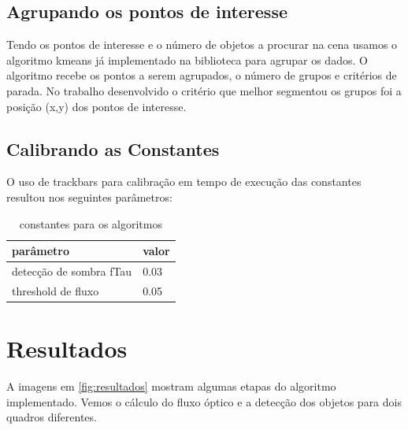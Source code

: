\documentclass[journal]{IEEEtran}
\begin{document}
\subsection{Agrupando os pontos de interesse}
Tendo os pontos de interesse e o número de objetos a 
procurar na cena usamos o algoritmo kmeans já implementado na 
biblioteca para agrupar os dados. O algoritmo recebe os pontos a 
serem agrupados, o número de grupos e critérios de parada. No 
trabalho desenvolvido o critério que melhor segmentou os grupos foi a 
posição (x,y) dos pontos de interesse.


\subsection{Calibrando as Constantes}
O uso de trackbars para calibração em tempo de execução 
das constantes resultou nos seguintes parâmetros:
\begin{table}[!htp]
\centering
 \begin{tabular}{|l|l|}\hline
 parâmetro & valor \\ \hline
 detecção de sombra fTau & 0.03 \\ \hline
 threshold de fluxo & 0.05 \\ \hline 
 \end{tabular}
\caption{constantes para os algoritmos}
\label{tab:threshold}
\end{table}


\newpage

\section{Resultados}
A imagens em \ref{fig:resultados} mostram algumas etapas do algoritmo implementado. Vemos o cálculo do fluxo óptico e a detecção dos objetos para
dois quadros diferentes.
\end{document}
